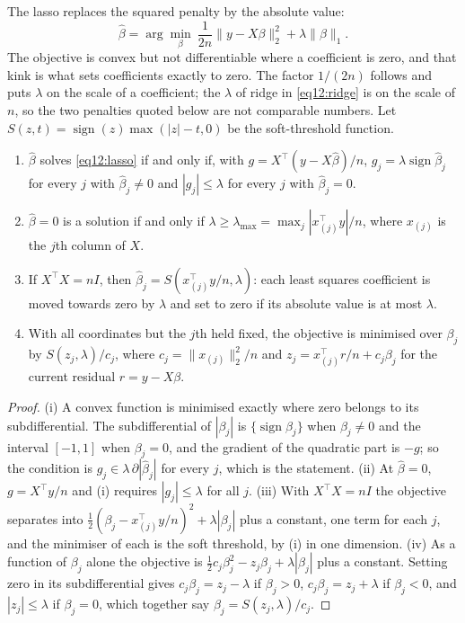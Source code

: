 \begin{chapterrefs}
The lasso \parencite{tibshirani1996} replaces the squared penalty by the absolute value:
\begin{equation}\label{eq12:lasso}
  \hat\beta=\arg\min_\beta\ \frac1{2n}\|y-X\beta\|_2^2+\lambda\|\beta\|_1 .
\end{equation}
The objective is convex but not differentiable where a coefficient is zero, and that kink is what sets
coefficients exactly to zero. The factor $1/(2n)$ follows \textcite{friedman2010} and puts $\lambda$ on the scale of a coefficient; the
$\lambda$ of ridge in \cref{eq12:ridge} is on the scale of $n$, so the two penalties quoted below are not
comparable numbers. Let $S(z,t)=\operatorname{sign}(z)\max(|z|-t,0)$ be the soft-threshold function.

\begin{proposition}\label{prop12:lasso}
\begin{enumerate}[label=(\roman*)]
\item $\hat\beta$ solves \cref{eq12:lasso} if and only if, with $g=X^\top(y-X\hat\beta)/n$,
$g_j=\lambda\operatorname{sign}\hat\beta_j$ for every $j$ with $\hat\beta_j\ne0$ and $|g_j|\le\lambda$ for every $j$
with $\hat\beta_j=0$.
\item $\hat\beta=0$ is a solution if and only if $\lambda\ge\lambda_{\max}=\max_j|x_{(j)}^\top y|/n$, where $x_{(j)}$ is the
$j$th column of $X$.
\item If $X^\top X=nI$, then $\hat\beta_j=S(x_{(j)}^\top y/n,\lambda)$: each least squares coefficient is
moved towards zero by $\lambda$ and set to zero if its absolute value is at most $\lambda$.
\item With all coordinates but the $j$th held fixed, the objective is minimised over $\beta_j$ by
$S(z_j,\lambda)/c_j$, where $c_j=\|x_{(j)}\|_2^2/n$ and $z_j=x_{(j)}^\top r/n+c_j\beta_j$ for the current
residual $r=y-X\beta$.
\end{enumerate}
\end{proposition}

\begin{proof}
(i) A convex function is minimised exactly where zero belongs to its subdifferential. The
subdifferential of $|\beta_j|$ is $\{\operatorname{sign}\beta_j\}$ when $\beta_j\ne0$ and the interval $[-1,1]$
when $\beta_j=0$, and the gradient of the quadratic part is $-g$; so the condition is $g_j\in\lambda\,\partial|\hat\beta_j|$
for every $j$, which is the statement. (ii) At $\hat\beta=0$, $g=X^\top y/n$ and (i) requires $|g_j|\le\lambda$ for
all $j$. (iii) With $X^\top X=nI$ the objective separates into $\tfrac12(\beta_j-x_{(j)}^\top y/n)^2+\lambda|\beta_j|$
plus a constant, one term for each $j$, and the minimiser of each is the soft threshold, by (i) in one dimension.
(iv) As a function of $\beta_j$ alone the objective is $\tfrac12c_j\beta_j^2-z_j\beta_j+\lambda|\beta_j|$ plus a
constant. Setting zero in its subdifferential gives $c_j\beta_j=z_j-\lambda$ if $\beta_j>0$,
$c_j\beta_j=z_j+\lambda$ if $\beta_j<0$, and $|z_j|\le\lambda$ if $\beta_j=0$, which together say
$\beta_j=S(z_j,\lambda)/c_j$.
\end{proof}


\end{chapterrefs}

